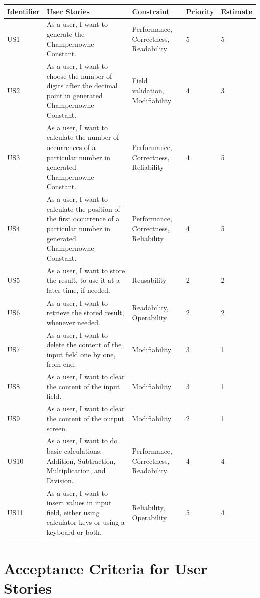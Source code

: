 \documentclass[paper=a4, fontsize=11pt]{report}
\numberwithin{equation}{section}		%
\numberwithin{figure}{section}			%
\numberwithin{table}{section}				%
\begin{document}
\begin{center}
\begin{tabular}{| m{1.3cm} | m{27em} | m{4cm}| m{1.2cm} | m{1.2cm} |} 
\hline
Identifier & User Stories & Constraint & Priority & Estimate \\ [0.7ex]
\hline\hline
US1 & As a user, I want to generate the Champernowne Constant. & Performance, Correctness, Readability & 5 & 5 \\ 
\hline
US2 & As a user, I want to choose the number of digits after the decimal point in generated Champernowne Constant. & Field validation, Modifiability & 4 & 3 \\ 
\hline
US3 & As a user, I want to calculate the number of occurrences of a particular number in generated Champernowne Constant. & Performance, Correctness, Reliability & 4 & 5 \\ 
\hline
US4 & As a user, I want to calculate the position of the first occurrence of a particular number in generated Champernowne Constant. & Performance, Correctness, Reliability & 4 & 5 \\ 
\hline
US5 & As a user, I want to store the result, to use it at a later time, if needed. & Reusability & 2 & 2 \\ 
\hline
US6 & As a user, I want to retrieve the stored result, whenever needed. & Readability, Operability & 2 & 2 \\ 
\hline
US7 & As a user, I want to delete the content of the input field one by one, from end. & Modifiability & 3 & 1 \\ 
\hline
US8 & As a user, I want to clear the content of the input field. & Modifiability & 3 & 1 \\ 
\hline
US9 & As a user, I want to clear the content of the output screen. & Modifiability & 2 & 1 \\ 
\hline
US10 & As a user, I want to do basic calculations: Addition, Subtraction, Multiplication, and Division. & Performance, Correctness, Readability & 4 & 4 \\ 
\hline
US11 & As a user, I want to insert values in input field, either using calculator keys or using a keyboard or both. & Reliability, Operability & 5 & 4 \\ 
\hline
\end{tabular}
\end{center}

\section{Acceptance Criteria for User Stories }
\end{document}
